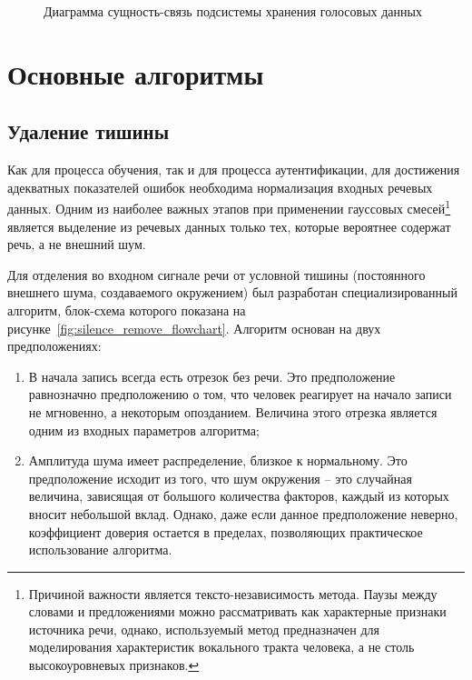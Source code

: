 \begin{figure}
    \caption{Диаграмма сущность-связь подсистемы хранения голосовых данных}
    \label{fig:er_main}
\end{figure}


\section{Основные алгоритмы}

\subsection{Удаление тишины}

Как для процесса обучения, так и для процесса аутентификации, для достижения адекватных показателей ошибок необходима нормализация входных речевых данных. Одним из наиболее важных этапов при применении гауссовых смесей\footnote{Причиной важности является тексто-независимость метода. Паузы между словами и предложениями можно рассматривать как характерные признаки источника речи, однако, используемый метод предназначен для моделирования характеристик вокального тракта человека, а не столь высокоуровневых признаков.} является выделение из речевых данных только тех, которые вероятнее содержат речь, а не внешний шум.

Для отделения во входном сигнале речи от условной тишины (постоянного внешнего шума, создаваемого окружением) был разработан специализированный алгоритм, блок-схема которого показана на рисунке~\ref{fig:silence_remove_flowchart}. Алгоритм основан на двух предположениях:

\begin{enumerate}
\item В начала запись всегда есть отрезок без речи. Это предположение равнозначно предположению о том, что человек реагирует на начало записи не мгновенно, а некоторым опозданием. Величина этого отрезка является одним из входных параметров алгоритма;
\item Амплитуда шума имеет распределение, близкое к нормальному. Это предположение исходит из того, что шум окружения -- это случайная величина, зависящая от большого количества факторов, каждый из которых вносит небольшой вклад. Однако, даже если данное предположение неверно, коэффициент доверия остается в пределах, позволяющих практическое использование алгоритма.
\end{enumerate}

